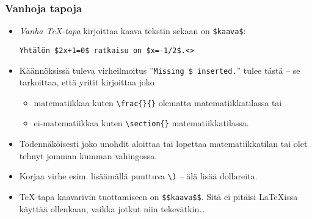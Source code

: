 \begin{fframe}
    \frametitle{Vanhoja tapoja}

    \begin{itemize}[<+->]
        \item \emph{Vanha \TeX-tapa} kirjoittaa kaava tekstin sekaan on \lstinline-$kaava$-:
            \begin{lstlisting}
Yhtälön $2x+1=0$ ratkaisu on $x=-1/2$.<>
            \end{lstlisting}
        \item Käännöksissä tuleva virheilmoitus ''\texttt{Missing \$ inserted.}'' tulee tästä -- se tarkoittaa, että yritit kirjoittaa joko 
            \begin{itemize}
                \item matematiikkaa kuten \lstinline-\frac{}{}- olematta matematiikkatilassa tai
                \item ei-matematiikkaa kuten \lstinline-\section{}- matematiikkatilassa.
            \end{itemize}

        \item Todennäköisesti joko unohdit aloittaa tai lopettaa matematiikkatilan tai olet tehnyt jomman kumman vahingossa.
        \item Korjaa virhe esim. lisäämällä puuttuva \verb-\)- -- älä lisää dollareita.
        \item \TeX-tapa kaavarivin tuottamiseen on \verb-$$kaava$$-. \alert{Sitä ei pitäisi \LaTeX{}issa käyttää ollenkaan}, vaikka jotkut niin tekevätkin\dots
    \end{itemize}
\end{fframe}

